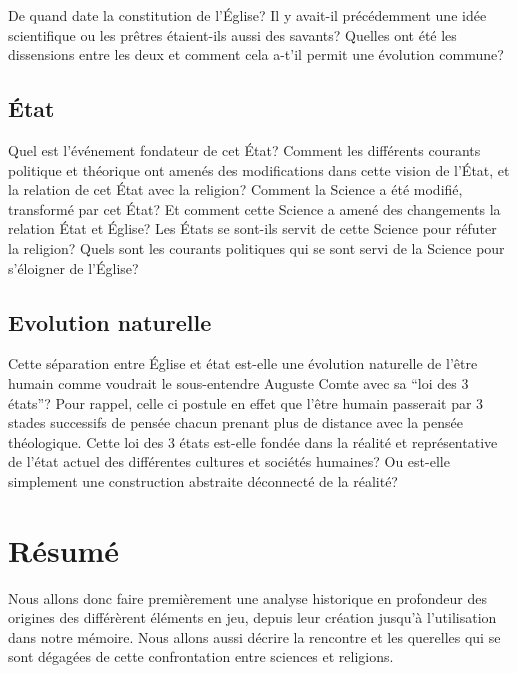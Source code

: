 \documentclass{article}
\begin{document}
De quand date la constitution de l'Église? Il y avait-il précédemment une idée
scientifique ou les prêtres étaient-ils aussi des savants? Quelles ont été les
dissensions entre les deux et comment cela a-t'il permit une évolution commune?

\subsection{État}

Quel est l'événement fondateur de cet État? Comment les différents courants
politique et théorique ont amenés des modifications dans cette vision de l'État,
et la relation de cet État avec la religion? Comment la Science a été modifié,
transformé par cet État? Et comment cette Science a amené des changements la
relation État et Église? Les États se sont-ils servit de cette Science pour
réfuter la religion? Quels sont les courants politiques qui se sont servi de la
Science pour s'éloigner de l'Église?

\subsection{Evolution naturelle}

Cette séparation entre Église et état est-elle une évolution naturelle
de l'être humain comme voudrait le sous-entendre Auguste Comte avec sa
``loi des 3 états''? Pour rappel, celle ci postule en effet que l'être humain
passerait par 3 stades successifs de pensée chacun prenant plus de
distance avec la pensée théologique. Cette loi des 3 états est-elle
fondée dans la réalité et représentative de l'état actuel des
différentes cultures et sociétés humaines? Ou est-elle simplement une
construction abstraite déconnecté de la réalité?

\section{Résumé}

Nous allons donc faire premièrement une analyse historique en profondeur des
origines des différèrent éléments en jeu, depuis leur création jusqu'à
l'utilisation dans notre mémoire. Nous allons aussi décrire la rencontre et les
querelles qui se sont dégagées de cette confrontation entre sciences et
religions.
\end{document}
